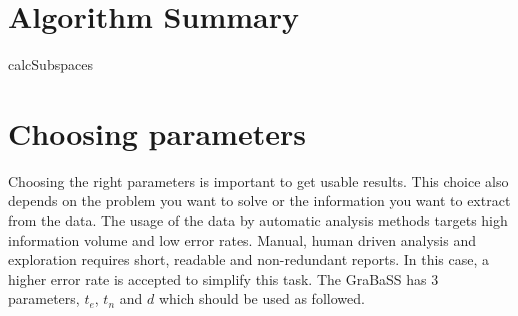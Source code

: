 \section{Algorithm Summary}
\begin{algorithm}


	\caption{calcSubspaces}
\end{algorithm}

\section{Choosing parameters}
Choosing the right parameters is important to get usable results. This choice also depends on the problem you want to solve or the information you want to extract from the data. The usage of the data by automatic analysis methods targets high information volume and low error rates. Manual, human driven analysis and exploration requires short, readable and non-redundant reports. In this case, a higher error rate is accepted to simplify this task. The GraBaSS has \num{3} parameters, $t_e$, $t_n$ and $d$ which should be used as followed.

